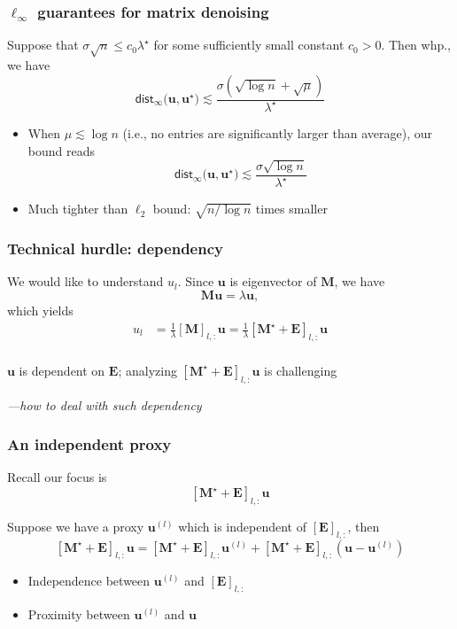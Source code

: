\documentclass[compress,
mathserif,wide,%
]{beamer}
\begin{document}
\begin{frame}
	\frametitle{$\ell_{\infty}$ guarantees for matrix denoising}
	\begin{theorem}\label{thm:denoising-inf}
		Suppose that $\sigma \sqrt{n} \leq c_0 \lambda^\star$ for some sufficiently small constant $c_0 > 0$. Then whp., we have 
		\[
		\mathsf{dist}_{\infty} \big(\bm{u},\bm{u}^{\star}\big) \lesssim \frac{\sigma (\sqrt{\log n} + \sqrt{\mu} ) }{ \lambda^\star }
		\]
	\end{theorem}
	
	\begin{itemize}
		\item When $\mu \lesssim \log n$ (i.e., no entries are significantly larger than average), our bound reads
		\[
		\mathsf{dist}_{\infty} \big(\bm{u},\bm{u}^{\star}\big) \lesssim \frac{\sigma \sqrt{\log n} }{ \lambda^\star }
		\]
		\item Much tighter than $\ell_{2}$ bound: $\sqrt{ n / \log n}$ times smaller
	\end{itemize}
\end{frame}

\begin{frame}
	\frametitle{Technical hurdle: dependency}
	We would like to understand $u_{l}$. Since $\bm{u}$ is eigenvector of $\bm{M}$, we have
	\[
	\bm{M} \bm{u} = \lambda \bm{u},
	\]
	which yields 
	\begin{align*}
	u_l & = \frac{1}{\lambda} [\bm{M}]_{l, :} \bm{u} = \frac{1}{\lambda} [\bm{M}^{\star} + \bm{E} ]_{l, :} \bm{u} \\
	\end{align*}
	
{

\begin{varblock}[\textwidth]{}
\begin{center}
	$\bm{u}$ is dependent on $\bm{E}$; analyzing $[\bm{M}^{\star} + \bm{E} ]_{l, :} \bm{u}$ is challenging
\end{center}
\end{varblock}
}
{\hfill \em ---how to deal with such dependency}
\end{frame}

\begin{frame}
	\frametitle{An independent proxy}
	Recall our focus is 
	\[
	[\bm{M}^{\star} + \bm{E} ]_{l, :} \bm{u}
	\]
	
	\vfill 
	Suppose we have a proxy $\bm{u}^{(l)}$ which is \alert{independent} of $[ \bm{E} ] _{l, :}$, then 
	\[
	[\bm{M}^{\star} + \bm{E} ]_{l, :} \bm{u} = [\bm{M}^{\star} + \bm{E} ]_{l, :} \bm{u}^{(l)} + [\bm{M}^{\star} + \bm{E} ]_{l, :} \left ( \bm{u} - \bm{u}^{(l)} \right )
	\]
	
	\begin{itemize}
		\item Independence between $\bm{u}^{(l)}$ and $[ \bm{E} ] _{l, :}$
		\item Proximity between $\bm{u}^{(l)}$ and $\bm{u}$
	\end{itemize}
\end{frame}
\end{document}
